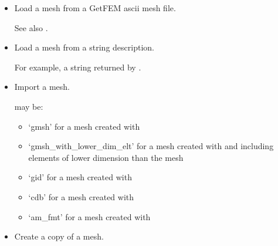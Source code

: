 \documentclass[a4paper,11pt,english]{sphinxmanual}
\begin{document}
\begin{fulllineitems}
\begin{itemize}
\item {} 
Load a mesh from a GetFEM ascii mesh file.

See also .

\item {} 
Load a mesh from a string description.

For example, a string returned by .

\item {} 
Import a mesh.

 may be:
\begin{itemize}
\item {} 
‘gmsh’ for a mesh created with 

\item {} 
‘gmsh\_with\_lower\_dim\_elt’ for a mesh created with  and including elements of lower dimension than the mesh

\item {} 
‘gid’ for a mesh created with 

\item {} 
‘cdb’ for a mesh created with 

\item {} 
‘am\_fmt’ for a mesh created with 

\end{itemize}

\item {} 
Create a copy of a mesh.


\end{itemize}
\end{fulllineitems}
\end{document}
